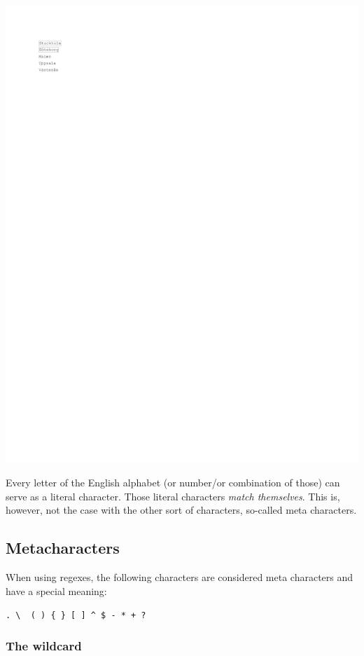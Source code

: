 \documentclass[
]{book}
\begin{document}
\includegraphics{_main_files/figure-latex/unnamed-chunk-21-1.pdf}

Every letter of the English alphabet (or number/or combination of those) can serve as a literal character. Those literal characters \emph{match themselves}. This is, however, not the case with the other sort of characters, so-called meta characters.

\hypertarget{metacharacters}{%
\subsection{Metacharacters}\label{metacharacters}}

When using regexes, the following characters are considered meta characters and have a special meaning:

\texttt{.\ \textbackslash{}\ \textbar{}\ (\ )\ \{\ \}\ {[}\ {]}\ \^{}\ \$\ -\ *\ +\ ?}

\hypertarget{the-wildcard}{%
\subsubsection{The wildcard}\label{the-wildcard}}
\end{document}
